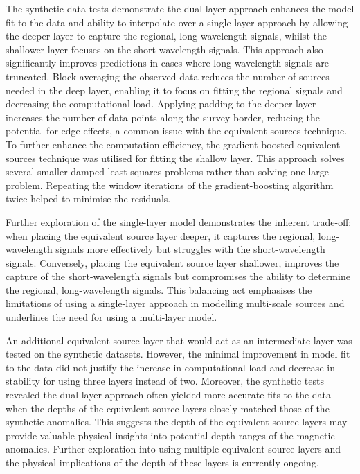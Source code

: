 The synthetic data tests demonstrate the dual layer approach enhances the model fit to the data and ability to interpolate over a single layer approach by allowing the deeper layer to capture the regional, long-wavelength signals, whilst the shallower layer focuses on the short-wavelength signals. This approach also significantly improves predictions in cases where long-wavelength signals are truncated. Block-averaging the observed data reduces the number of sources needed in the deep layer, enabling it to focus on fitting the regional signals and decreasing the computational load. Applying padding to the deeper layer increases the number of data points along the survey border, reducing the potential for edge effects, a common issue with the equivalent sources technique. To further enhance the computation efficiency, the gradient-boosted equivalent sources technique was utilised for fitting the shallow layer. This approach solves several smaller damped least-squares problems rather than solving one large problem. Repeating the window iterations of the gradient-boosting algorithm twice helped to minimise the residuals.

Further exploration of the single-layer model demonstrates the inherent trade-off: when placing the equivalent source layer deeper, it captures the regional, long-wavelength signals more effectively but struggles with the short-wavelength signals. Conversely, placing the equivalent source layer shallower, improves the capture of the short-wavelength signals but compromises the ability to determine the regional, long-wavelength signals. This balancing act emphasises the limitations of using a single-layer approach in modelling multi-scale sources and underlines the need for using a multi-layer model. 

An additional equivalent source layer that would act as an intermediate layer was tested on the synthetic datasets. However, the minimal improvement in model fit to the data did not justify the increase in computational load and decrease in stability for using three layers instead of two. Moreover, the synthetic tests revealed the dual layer approach often yielded more accurate fits to the data when the depths of the equivalent source layers closely matched those of the synthetic anomalies. This suggests the depth of the equivalent source layers may provide valuable physical insights into potential depth ranges of the magnetic anomalies. Further exploration into using multiple equivalent source layers and the physical implications of the depth of these layers is currently ongoing.

